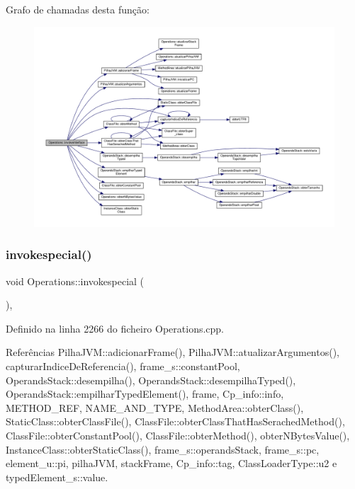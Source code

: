 Grafo de chamadas desta função\+:\nopagebreak
\begin{figure}[H]
\begin{center}
\leavevmode
\includegraphics[width=350pt]{classOperations_a9206595fad5d3ac24514b2dfd6a013da_cgraph}
\end{center}
\end{figure}
\mbox{\label{classOperations_ab561e27c8450ceec7e4f8b0a155fcda3}} 
\subsubsection{\texorpdfstring{invokespecial()}{invokespecial()}}
{\footnotesize\ttfamily void Operations\+::invokespecial (\begin{DoxyParamCaption}{ }\end{DoxyParamCaption})\hspace{0.3cm}{\ttfamily [static]}, {\ttfamily [private]}}



Definido na linha 2266 do ficheiro Operations.\+cpp.



Referências Pilha\+J\+V\+M\+::adicionar\+Frame(), Pilha\+J\+V\+M\+::atualizar\+Argumentos(), capturar\+Indice\+De\+Referencia(), frame\+\_\+s\+::constant\+Pool, Operands\+Stack\+::desempilha(), Operands\+Stack\+::desempilha\+Typed(), Operands\+Stack\+::empilhar\+Typed\+Element(), frame, Cp\+\_\+info\+::info, M\+E\+T\+H\+O\+D\+\_\+\+R\+EF, N\+A\+M\+E\+\_\+\+A\+N\+D\+\_\+\+T\+Y\+PE, Method\+Area\+::obter\+Class(), Static\+Class\+::obter\+Class\+File(), Class\+File\+::obter\+Class\+That\+Has\+Serached\+Method(), Class\+File\+::obter\+Constant\+Pool(), Class\+File\+::obter\+Method(), obter\+N\+Bytes\+Value(), Instance\+Class\+::obter\+Static\+Class(), frame\+\_\+s\+::operands\+Stack, frame\+\_\+s\+::pc, element\+\_\+u\+::pi, pilha\+J\+VM, stack\+Frame, Cp\+\_\+info\+::tag, Class\+Loader\+Type\+::u2 e typed\+Element\+\_\+s\+::value.

